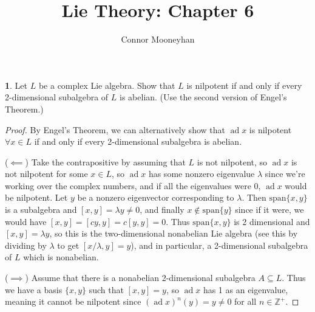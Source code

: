 \documentclass[12pt]{article}
\title{Lie Theory: Chapter 6}
\author{Connor Mooneyhan}
\date{}
\DeclareMathOperator{\ad}{ad}
\theoremstyle{definition}
\newtheorem{ex}{}
\begin{document}
\maketitle

\begin{ex}
	Let $L$ be a complex Lie algebra.
	Show that $L$ is nilpotent if and only if every 2-dimensional subalgebra of $L$ is abelian.
	(Use the second version of Engel's Theorem.)
\end{ex}
\begin{proof}
	By Engel's Theorem, we can alternatively show that $\ad x$ is nilpotent $\forall x \in L$ if and only if every 2-dimensional subalgebra is abelian.

  ($\impliedby$) Take the contrapositive by assuming that $L$ is not nilpotent, so $\ad x$ is not nilpotent for some $x \in L$, so $\ad x$ has some nonzero eigenvalue $\lambda$ since we're working over the complex numbers, and if all the eigenvalues were 0, $\ad x$ would be nilpotent.
	Let $y$ be a nonzero eigenvector corresponding to $\lambda$.
  Then $\mathrm{span}\lbrace x, y \rbrace$ is a subalgebra and $[x, y] = \lambda y \neq 0$, and finally $x \notin \mathrm{span}\lbrace y \rbrace$ since if it were, we would have $[x, y] = [cy, y] = c[y, y] = 0$.
  Thus $\mathrm{span}\lbrace x, y \rbrace$ is 2 dimensional and $[x, y] = \lambda y$, so this is the two-dimensional nonabelian Lie algebra (see this by dividing by $\lambda$ to get $[x/\lambda, y] = y$), and in particular, a 2-dimensional subalgebra of $L$ which is nonabelian.

  ($\implies$) Assume that there is a nonabelian 2-dimensional subalgebra $A \subseteq L$. 
  Thus we have a basis $\lbrace x, y \rbrace$ such that $[x, y] = y$, so $\ad x$ has 1 as an eigenvalue, meaning it cannot be nilpotent since $(\ad x)^n(y) = y \neq 0$ for all $n \in \mathbb{Z}^+$.
\end{proof}
\end{document}
